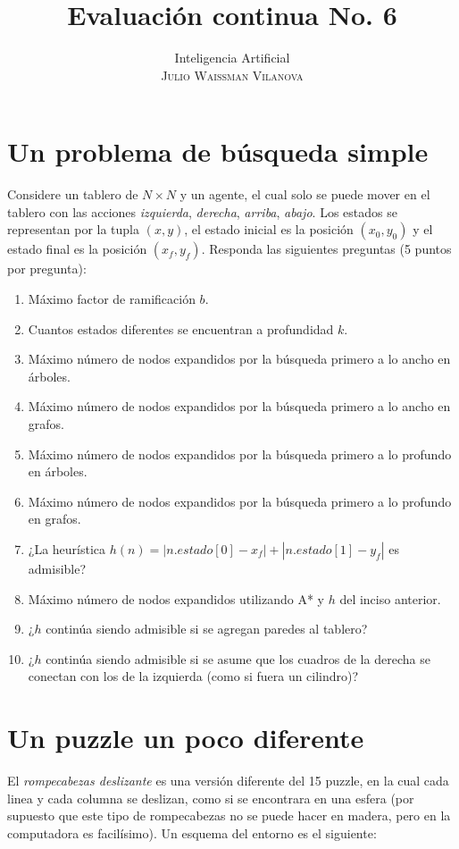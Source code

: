 \documentclass[onecolumn, letter, 12pt]{article}
\title{Evaluación continua No. 6}
\author{Inteligencia Artificial\\ \textsc{Julio Waissman Vilanova}}
\date{}
\begin{document}
\maketitle

\section*{Un problema de búsqueda simple}

Considere un tablero de $N\times N$ y un agente, el cual solo se puede mover en el tablero
con las acciones \emph{izquierda}, \emph{derecha}, \emph{arriba}, \emph{abajo}. Los
estados se representan por la tupla $(x,y)$, el estado inicial es la posición $(x_0,y_0)$
y el estado final es la posición $(x_f,y_f)$.  Responda las siguientes preguntas (5 puntos
por pregunta):

\begin{enumerate}
\item Máximo factor de ramificación $b$.
\item Cuantos estados diferentes se encuentran a profundidad $k$.
\item Máximo número de nodos expandidos por la búsqueda primero a lo ancho en árboles.
\item Máximo número de nodos expandidos por la búsqueda primero a lo ancho en grafos.
\item Máximo número de nodos expandidos por la búsqueda primero a lo profundo en árboles.
\item Máximo número de nodos expandidos por la búsqueda primero a lo profundo en grafos.
\item ¿La heurística $h(n) = |n.estado[0] - x_f| + |n.estado[1] - y_f|$ es admisible?
\item Máximo número de nodos expandidos utilizando A* y $h$ del inciso anterior.
\item ¿$h$ continúa siendo admisible si se agregan paredes al tablero?
\item ¿$h$ continúa siendo admisible si se asume que los cuadros de la derecha se conectan con los de la izquierda (como si fuera un cilindro)?
\end{enumerate}

\newpage

\section*{Un puzzle un poco diferente}

El \emph{rompecabezas deslizante} es una versión diferente del 15 puzzle, en la cual cada linea y cada columna se deslizan, como si se encontrara en una esfera (por supuesto que este tipo de rompecabezas no se puede hacer en madera, pero en la computadora es facilísimo). Un esquema del entorno es el siguiente:
\end{document}
